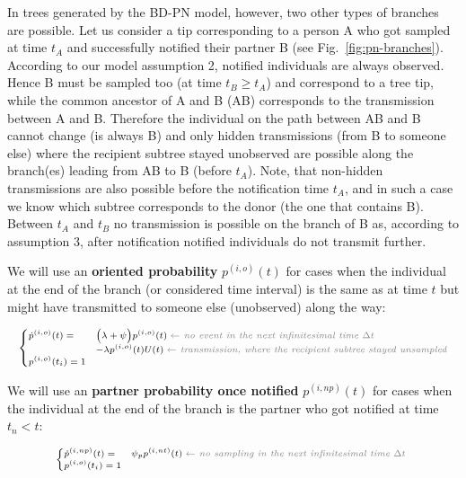 \documentclass[a4paper,10pt]{article}
\begin{document}
In trees generated by the BD-PN model, however, two other types of branches are possible. Let us consider a tip corresponding to a person A who got sampled at time $t_A$ and successfully notified their partner B (see Fig.~\ref{fig:pn-branches}). According to our model assumption 2, notified individuals are always observed. Hence B must be sampled too (at time $t_B \geq t_A$) and correspond to a tree tip, while the common ancestor of A and B (AB) corresponds to the transmission between A and B. Therefore the individual on the path between AB and B cannot change (is always B) and only hidden transmissions (from B to someone else) where the recipient subtree stayed unobserved are possible along the branch(es) leading from AB to B (before $t_A$). Note, that non-hidden transmissions are also possible before the notification time $t_A$, and in such a case we know which subtree corresponds to the donor (the one that contains B). Between $t_A$ and $t_B$ no transmission is possible on the branch of B as, according to assumption 3, after notification notified individuals do not transmit further.

We will use an \textbf{oriented probability} $p^{(i,o)}(t)$ for cases when the individual at the end of the branch (or considered time interval) is the same as at time $t$ but might have transmitted to someone else (unobserved) along the way:

\begin{equation}
\scriptsize
\begin{cases}
\dot{p}^{(i,o)}(t) = & \Big(\lambda + \psi\Big) p^{(i,o)}(t)\; \textit{\color{gray} $\leftarrow$ no event in the next infinitesimal time $\Delta t$ }\\
    & - \lambda p^{(i,o)}(t)U(t)\;  \textit{\color{gray} $\leftarrow$ transmission, where the recipient subtree stayed unsampled}\\
p^{(i,o)}(t_i) = 1\label{eq:p-o}
\end{cases}
\end{equation}

We will use an \textbf{partner probability once notified} $p^{(i,np)}(t)$ for cases when the individual at the end of the branch is the partner who got notified at time $t_n < t$:

\begin{equation}
\scriptsize
\begin{cases}
\dot{p}^{(i,np)}(t) = & \psi_p p^{(i,nt)}(t)\; \textit{\color{gray} $\leftarrow$ no sampling in the next infinitesimal time $\Delta t$ }\\
p^{(i,o)}(t_i) = 1\label{eq:p-np}
\end{cases}
\end{equation}
\end{document}
